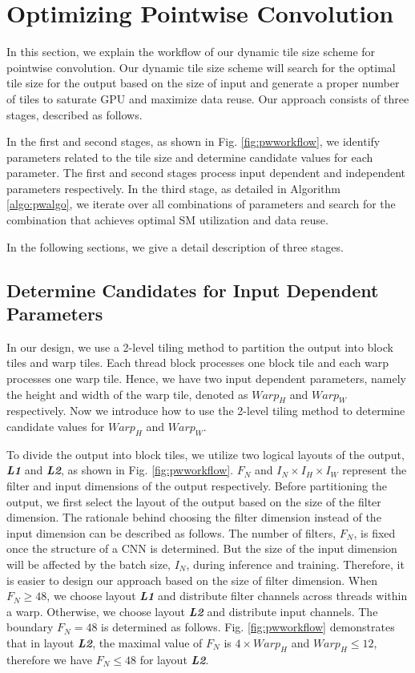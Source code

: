 \section{Optimizing Pointwise Convolution}
\label{sec:pwconv} In this section, we explain the workflow of our dynamic tile size scheme for pointwise convolution.
Our dynamic tile size scheme will search for the optimal tile size for the output based on the size of input and generate a proper number of tiles to saturate GPU and maximize data reuse.
Our approach consists of three stages, described as follows.

In the first and second stages, as shown in Fig. \ref{fig:pwworkflow}, we identify parameters related to the tile size and determine candidate values for each parameter. The first and second stages process input dependent and independent parameters respectively. 
In the third stage, as detailed in Algorithm \ref{algo:pwalgo}, we iterate over all combinations of parameters and search for the combination that achieves optimal SM utilization and data reuse.   


In the following sections, we give a detail description of three stages. 
\subsection{Determine Candidates for Input Dependent Parameters}
In our design, we use a 2-level tiling method to partition the output into block tiles and warp tiles.
Each thread block processes one block tile and each warp processes one warp tile.
Hence, we have two input dependent parameters, namely the height and width of the warp tile, denoted as $Warp_H$ and $Warp_W$ respectively.
Now we introduce how to use the 2-level tiling method to determine candidate values for $Warp_H$ and $Warp_W$. 

To divide the output into block tiles, we utilize two logical layouts of the output, \textbf{\emph{L1}} and \textbf{\emph{L2}}, as shown in Fig. \ref{fig:pwworkflow}.
$F_N$ and $I_N \times I_H \times I_W$ represent the filter and input dimensions of the output respectively.
Before partitioning the output, we first select the layout of the output based on the size of the filter dimension.
The rationale behind choosing the filter dimension instead of the input dimension can be described as follows.
The number of filters, $F_N$, is fixed once the structure of a CNN is determined.
But the size of the input dimension will be affected by the batch size, $I_N$, during inference and training.
Therefore, it is easier to design our approach based on the size of filter dimension.
When $F_N \ge 48$, we choose layout \textbf{\emph{L1}} and distribute filter channels across threads within a warp.
Otherwise, we choose layout \textbf{\emph{L2}} and distribute input channels.
The boundary $F_N = 48$ is determined as follows.
Fig. \ref{fig:pwworkflow} demonstrates that in layout \textbf{\emph{L2}}, the maximal value of $F_N$ is $4 \times Warp_H$ and $Warp_H \leq 12$, therefore we have $F_N \leq 48$ for layout \textbf{\emph{L2}}.

